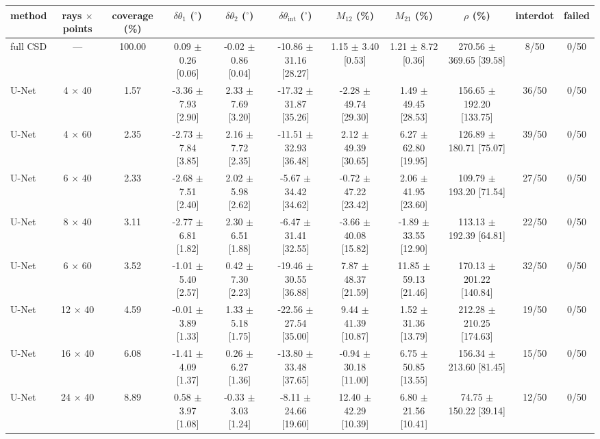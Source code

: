 \begin{tabular}{lcccccccccc}
\hline
method & rays $\times$ points & coverage (\%) & $\delta\theta_1$ ($^\circ$) & $\delta\theta_2$ ($^\circ$) & $\delta\theta_\mathrm{int}$ ($^\circ$) & $M_{12}$ (\%) & $M_{21}$ (\%) & $\rho$ (\%) & interdot & failed \\ \hline
full CSD & — & 100.00 & 0.09 $\pm$ 0.26 [0.06] & -0.02 $\pm$ 0.86 [0.04] & -10.86 $\pm$ 31.16 [28.27] & 1.15 $\pm$ 3.40 [0.53] & 1.21 $\pm$ 8.72 [0.36] & 270.56 $\pm$ 369.65 [39.58] & 8/50 & 0/50 \\
U-Net & 4 $\times$ 40 & 1.57 & -3.36 $\pm$ 7.93 [2.90] & 2.33 $\pm$ 7.69 [3.20] & -17.32 $\pm$ 31.87 [35.26] & -2.28 $\pm$ 49.74 [29.30] & 1.49 $\pm$ 49.45 [28.53] & 156.65 $\pm$ 192.20 [133.75] & 36/50 & 0/50 \\
U-Net & 4 $\times$ 60 & 2.35 & -2.73 $\pm$ 7.84 [3.85] & 2.16 $\pm$ 7.72 [2.35] & -11.51 $\pm$ 32.93 [36.48] & 2.12 $\pm$ 49.39 [30.65] & 6.27 $\pm$ 62.80 [19.95] & 126.89 $\pm$ 180.71 [75.07] & 39/50 & 0/50 \\
U-Net & 6 $\times$ 40 & 2.33 & -2.68 $\pm$ 7.51 [2.40] & 2.02 $\pm$ 5.98 [2.62] & -5.67 $\pm$ 34.42 [34.62] & -0.72 $\pm$ 47.22 [23.42] & 2.06 $\pm$ 41.95 [23.60] & 109.79 $\pm$ 193.20 [71.54] & 27/50 & 0/50 \\
U-Net & 8 $\times$ 40 & 3.11 & -2.77 $\pm$ 6.81 [1.82] & 2.30 $\pm$ 6.51 [1.88] & -6.47 $\pm$ 31.41 [32.55] & -3.66 $\pm$ 40.08 [15.82] & -1.89 $\pm$ 33.55 [12.90] & 113.13 $\pm$ 192.39 [64.81] & 22/50 & 0/50 \\
U-Net & 6 $\times$ 60 & 3.52 & -1.01 $\pm$ 5.40 [2.57] & 0.42 $\pm$ 7.30 [2.23] & -19.46 $\pm$ 30.55 [36.88] & 7.87 $\pm$ 48.37 [21.59] & 11.85 $\pm$ 59.13 [21.46] & 170.13 $\pm$ 201.22 [140.84] & 32/50 & 0/50 \\
U-Net & 12 $\times$ 40 & 4.59 & -0.01 $\pm$ 3.89 [1.33] & 1.33 $\pm$ 5.18 [1.75] & -22.56 $\pm$ 27.54 [35.00] & 9.44 $\pm$ 41.39 [10.87] & 1.52 $\pm$ 31.36 [13.79] & 212.28 $\pm$ 210.25 [174.63] & 19/50 & 0/50 \\
U-Net & 16 $\times$ 40 & 6.08 & -1.41 $\pm$ 4.09 [1.37] & 0.26 $\pm$ 6.27 [1.36] & -13.80 $\pm$ 33.48 [37.65] & -0.94 $\pm$ 30.18 [11.00] & 6.75 $\pm$ 50.85 [13.55] & 156.34 $\pm$ 213.60 [81.45] & 15/50 & 0/50 \\
U-Net & 24 $\times$ 40 & 8.89 & 0.58 $\pm$ 3.97 [1.08] & -0.33 $\pm$ 3.03 [1.24] & -8.11 $\pm$ 24.66 [19.60] & 12.40 $\pm$ 42.29 [10.39] & 6.80 $\pm$ 21.56 [10.41] & 74.75 $\pm$ 150.22 [39.14] & 12/50 & 0/50 \\
\hline
\end{tabular}
